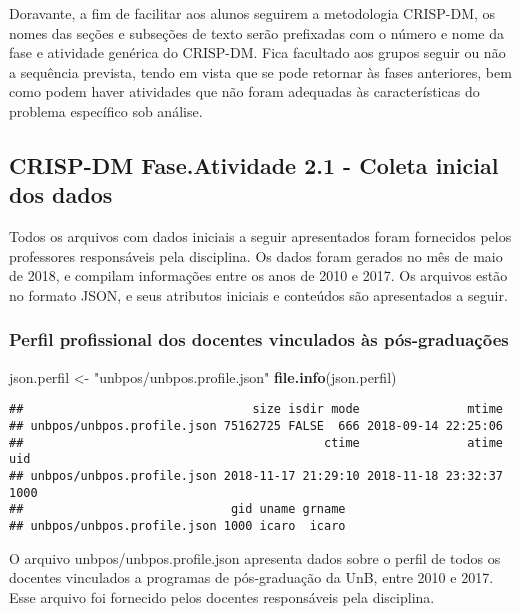 \documentclass[]{article}
\newenvironment{Shaded}{\begin{snugshade}}{\end{snugshade}}
\newcommand{\KeywordTok}[1]{\textcolor[rgb]{0.13,0.29,0.53}{\textbf{#1}}}
\newcommand{\StringTok}[1]{\textcolor[rgb]{0.31,0.60,0.02}{#1}}
\newcommand{\NormalTok}[1]{#1}
\begin{document}
Doravante, a fim de facilitar aos alunos seguirem a metodologia
CRISP-DM, os nomes das seções e subseções de texto serão prefixadas com
o número e nome da fase e atividade genérica do CRISP-DM. Fica facultado
aos grupos seguir ou não a sequência prevista, tendo em vista que se
pode retornar às fases anteriores, bem como podem haver atividades que
não foram adequadas às características do problema específico sob
análise.

\subsection{CRISP-DM Fase.Atividade 2.1 - Coleta inicial dos
dados}\label{crisp-dm-fase.atividade-2.1---coleta-inicial-dos-dados}

Todos os arquivos com dados iniciais a seguir apresentados foram
fornecidos pelos professores responsáveis pela disciplina. Os dados
foram gerados no mês de maio de 2018, e compilam informações entre os
anos de 2010 e 2017. Os arquivos estão no formato JSON, e seus atributos
iniciais e conteúdos são apresentados a seguir.

\subsubsection{Perfil profissional dos docentes vinculados às
pós-graduações}\label{perfil-profissional-dos-docentes-vinculados-as-pos-graduacoes}

\begin{Shaded}
\begin{Highlighting}[]
\NormalTok{json.perfil <-}\StringTok{ "unbpos/unbpos.profile.json"}
\KeywordTok{file.info}\NormalTok{(json.perfil)}
\end{Highlighting}
\end{Shaded}

\begin{verbatim}
##                                size isdir mode               mtime
## unbpos/unbpos.profile.json 75162725 FALSE  666 2018-09-14 22:25:06
##                                          ctime               atime  uid
## unbpos/unbpos.profile.json 2018-11-17 21:29:10 2018-11-18 23:32:37 1000
##                             gid uname grname
## unbpos/unbpos.profile.json 1000 icaro  icaro
\end{verbatim}

O arquivo unbpos/unbpos.profile.json apresenta dados sobre o perfil de
todos os docentes vinculados a programas de pós-graduação da UnB, entre
2010 e 2017. Esse arquivo foi fornecido pelos docentes responsáveis pela
disciplina.
\end{document}
